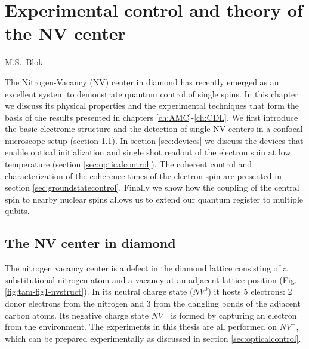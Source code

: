 \graphicspath{{./ch_theory_and_methods/figures/}}


\chapter{Experimental control and theory of the NV center}
\label{ch:TAM}

\begin{center} 
    \vspace{-1cm} {M.S.~Blok} 
\end{center}


\vspace{-0.5cm} 
The Nitrogen-Vacancy (NV) center in diamond has recently emerged as an excellent system to demonstrate quantum control of single spins. In this chapter we discuss its physical properties and the experimental techniques that form the basis of the results presented in chapters \ref{ch:AMC}-\ref{ch:CDL}. We first introduce the basic electronic structure and the detection of single NV centers in a confocal microscope setup (section \ref{sec:NVcenter}). In section \ref{sec:devices} we discuss the devices that enable optical initialization and single shot readout of the electron spin at low temperature (section \ref{sec:opticalcontrol}). The coherent control and characterization of the coherence times of the electron spin are presented in section \ref{sec:groundstatecontrol}. Finally we show how the coupling of the central spin to nearby nuclear spins allows us to extend our quantum register to multiple qubits.
\clearpage


\section{The NV center in diamond}
\label{sec:NVcenter}

The nitrogen vacancy center is a defect in the diamond lattice consisting of a substitutional nitrogen atom and a vacancy at an adjacent lattice position (Fig. \ref{fig:tam-fig1-nvstruct}). In its neutral charge state ($NV^{0}$) it hosts 5 electrons: 2 donor electrons from the nitrogen and 3 from the dangling bonds of the adjacent carbon atoms. Its negative charge state $NV^{-}$ is formed by capturing an electron from the environment. The experiments in this thesis are all performed on $NV^{-}$, which can be prepared experimentally as discussed in section \ref{sec:opticalcontrol}.

